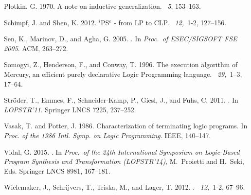 \documentclass[fleqn]{tlp}
\begin{document}
\begin{thebibliography}{}
{\sc Plotkin, G.} 1970.
\newblock A note on inductive generalization.
~{\em 5}, 153--163.

{\sc Schimpf, J.} {\sc and} {\sc Shen, K.} 2012.
\({}^{\mbox{$i$}}\){PS}\({}^{\mbox{$e$}}\) - from {LP} to {CLP}.
~{\em 12,\/}~1-2,
  127--156.

{\sc Sen, K.}, {\sc Marinov, D.}, {\sc and} {\sc Agha, G.} 2005.
.
\newblock In {\em Proc.\ of ESEC/SIGSOFT FSE 2005}. ACM, 263--272.

{\sc Somogyi, Z.}, {\sc Henderson, F.}, {\sc and} {\sc Conway, T.} 1996.
\newblock The execution algorithm of {Mercury}, an efficient purely declarative
  {Logic Programming} language.
~{\em 29,\/}~1--3, 17--64.

{\sc Str{\"o}der, T.}, {\sc Emmes, F.}, {\sc Schneider-Kamp, P.}, {\sc Giesl,
  J.}, {\sc and} {\sc Fuhs, C.} 2011.
.
\newblock In {\em LOPSTR'11}. Springer LNCS 7225, 237--252.

{\sc Vasak, T.} {\sc and} {\sc Potter, J.} 1986.
\newblock Characterization of terminating logic programs.
\newblock In {\em Proc. of the 1986 Intl. Symp. on {Logic Programming}}. IEEE,
  140--147.

{\sc Vidal, G.} 2015.
.
\newblock In {\em Proc.\ of the 24th International Symposium on Logic-Based
  Program Synthesis and Transformation (LOPSTR'14)}, {M.~Proietti} {and}
  {H.~Seki}, Eds. Springer LNCS 8981, 167--181.

{\sc Wielemaker, J.}, {\sc Schrijvers, T.}, {\sc Triska, M.}, {\sc and} {\sc
  Lager, T.} 2012.
.
~{\em 12,\/}~1-2,
  67--96.

\end{thebibliography}
\end{document}
